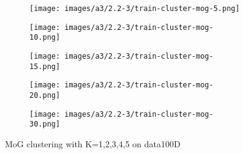 \documentclass[12pt]{article}
\begin{document}
\begin{figure}[!htb]
\centering
\begin{subfigure}{.33\linewidth}
  \centering
  \texttt{[image: images/a3/2.2-3/train-cluster-mog-5.png]}
\end{subfigure}%
\begin{subfigure}{.33\linewidth}
  \centering
  \texttt{[image: images/a3/2.2-3/train-cluster-mog-10.png]}
\end{subfigure}
\begin{subfigure}{.33\linewidth}
  \centering
  \texttt{[image: images/a3/2.2-3/train-cluster-mog-15.png]}
\end{subfigure}
\begin{subfigure}{.33\linewidth}
  \centering
  \texttt{[image: images/a3/2.2-3/train-cluster-mog-20.png]}
\end{subfigure}
\begin{subfigure}{.33\linewidth}
  \centering
  \texttt{[image: images/a3/2.2-3/train-cluster-mog-30.png]}
\end{subfigure}
\caption{MoG clustering with K=1,2,3,4,5 on data100D}
\label{fig:a3-2.2-3-mog}
\end{figure}


\newpage
\end{document}
